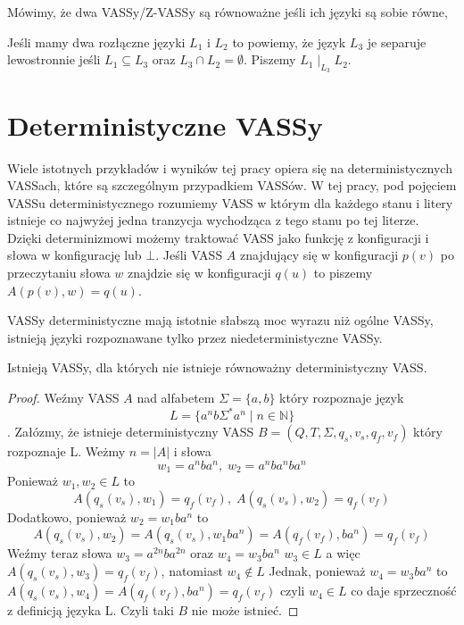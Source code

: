     Mówimy, że dwa VASSy/Z-VASSy są równoważne jeśli ich języki są sobie równe,

    Jeśli mamy dwa rozłączne języki $L_1$ i $L_2$ to powiemy, że język $L_3$ je separuje lewostronnie jeśli
    $L_1 \subseteq L_3$ oraz $L_3 \cap L_2 = \emptyset$. Piszemy $L_1 \mid_{L_3} L_2$.


    \section{Deterministyczne VASSy}
    Wiele istotnych przykładów i wyników tej pracy opiera się na deterministycznych VASSach, które są szczególnym przypadkiem VASSów.
    W tej pracy, pod pojęciem VASSu deterministycznego rozumiemy VASS w
    którym dla każdego stanu i litery istnieje co najwyżej jedna tranzycja wychodząca z tego stanu po tej literze.
    Dzięki determinizmowi możemy traktować VASS jako funkcję z konfiguracji i słowa w konfigurację lub $\bot$.
    Jeśli VASS $A$ znajdujący się w konfiguracji $p(v)$ po przeczytaniu słowa $w$  znajdzie się w konfiguracji $q(u)$ to piszemy
    $A(p(v),w) = q(u)$.

    VASSy deterministyczne mają istotnie słabszą moc wyrazu niż ogólne VASSy, istnieją języki rozpoznawane tylko przez niedeterministyczne VASSy.
    \begin{theorem}
        \label{non-det}
        Istnieją VASSy, dla których nie istnieje równoważny deterministyczny VASS.
    \end{theorem}
    \begin{proof}
        Weźmy VASS $A$ nad alfabetem $\Sigma = \{a,b\}$  który rozpoznaje język  \[L = \{a^n b \Sigma^* a^n \mid n \in \mathbb{N}\}\].
        Załózmy, że istnieje deterministyczny VASS $B=(Q,T,\Sigma,q_s,v_s,q_f,v_f)$ który rozpoznaje L.
        Weżmy $n=|A|$ i słowa \[w_1 = a^n b a^n,\; w_2 = a^n b a^n b a^n\]
        Ponieważ $w_1,w_2 \in L$ to \[A(q_s(v_s),w_1) = q_f(v_f), \;A(q_s(v_s),w_2) = q_f(v_f)\]
        Dodatkowo, ponieważ $w_2 = w_1 b a^n$ to \[A(q_s(v_s),w_2) = A(q_s(v_s),w_1 b a^n)  = A(q_f(v_f),b a^n) = q_f(v_f) \]
        Weźmy teraz słowa $w_3 = a^{2n} b a^{2n} $ oraz $w_4 =  w_3 b a^n $
        $w_3 \in L$ a więc $A(q_s(v_s),w_3) = q_f(v_f)$, natomiast $w_4 \notin L$
        Jednak, ponieważ $w_4 =  w_3 b a^n $ to $A(q_s(v_s),w_4) = A(q_f(v_f),b a^n) = q_f(v_f)$ czyli $w_4 \in L$
        co daje sprzeczność z definicją języka L. Czyli taki $B$ nie może istnieć.
    \end{proof}

